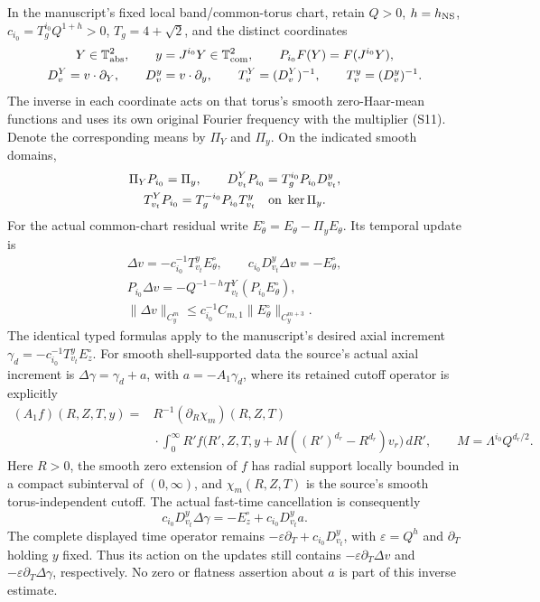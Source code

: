 \begin{proposition}
In the manuscript's fixed local band/common-torus chart, retain
$Q>0$, $h=h_{\rm NS}$, $c_{i_0}=T_g^{i_0}Q^{1+h}>0$,
$T_g=4+\sqrt2$, and the distinct coordinates
\[
 \begin{gathered}
 Y\in\mathbb T^2_{\rm abs},\qquad y=J^{i_0}Y\in\mathbb T^2_{\rm com},
 \qquad P_{i_0}F(Y)=F(J^{i_0}Y),\\
 D_v^Y=v\cdot\partial_Y,\qquad D_v^y=v\cdot\partial_y,\qquad
 T_v^Y=(D_v^Y)^{-1},\qquad T_v^y=(D_v^y)^{-1}.
 \end{gathered}
\]
The inverse in each coordinate acts on that torus's smooth
zero-Haar-mean functions and uses its own original Fourier
frequency with the multiplier (S11). Denote the corresponding
means by $\Pi_Y$ and $\Pi_y$. On the indicated smooth domains,
\[
 \begin{gathered}
 \Pi_Y P_{i_0}=\Pi_y,\qquad
 D_{v_t}^Y P_{i_0}=T_g^{i_0}P_{i_0}D_{v_t}^y,\\
 T_{v_t}^Y P_{i_0}=T_g^{-i_0}P_{i_0}T_{v_t}^y
       \quad\hbox{on }\ker\Pi_y.
 \end{gathered}
\]
For the actual common-chart residual write
$E_\theta^\circ=E_\theta-\Pi_yE_\theta$. Its temporal update is
\[
 \begin{gathered}
 \Delta v=-c_{i_0}^{-1}T_{v_t}^yE_\theta^\circ,\qquad
 c_{i_0}D_{v_t}^y\Delta v=-E_\theta^\circ,\\
 P_{i_0}\Delta v=-Q^{-1-h}T_{v_t}^Y(P_{i_0}E_\theta^\circ),\\
 \|\Delta v\|_{C_y^m}
       \leq c_{i_0}^{-1}C_{m,1}\|E_\theta^\circ\|_{C_y^{m+3}}.
 \end{gathered}
                                                               \tag{S17}
\]
The identical typed formulas apply to the manuscript's desired axial
increment $\gamma_d=-c_{i_0}^{-1}T_{v_t}^yE_z^\circ$.
For smooth shell-supported data the source's actual axial increment is
$\Delta\gamma=\gamma_d+a$, with $a=-A_1\gamma_d$, where its
retained cutoff operator is explicitly
\[
 \begin{split}
 (A_1f)(R,Z,T,y)
  ={}&R^{-1}(\partial_R\chi_m)(R,Z,T)\\
  &{}\cdot\int_0^\infty R'f\bigl(R',Z,T,
          y+M((R')^{d_r}-R^{d_r})v_r\bigr)\,dR',
 \qquad M=\Lambda^{i_0}Q^{d_r/2}.
 \end{split}
\]
Here $R>0$, the smooth zero extension of $f$ has radial support
locally bounded in a compact subinterval of $(0,\infty)$, and
$\chi_m(R,Z,T)$ is the source's smooth torus-independent cutoff.
The actual fast-time cancellation is consequently
\[
 c_{i_0}D_{v_t}^y\Delta\gamma
       =-E_z^\circ+c_{i_0}D_{v_t}^y a.
\]
The complete displayed time operator remains
$-\varepsilon\partial_T+c_{i_0}D_{v_t}^y$, with
$\varepsilon=Q^h$ and $\partial_T$ holding $y$ fixed. Thus its
action on the updates still contains
$-\varepsilon\partial_T\Delta v$ and
$-\varepsilon\partial_T\Delta\gamma$, respectively.
No zero or flatness assertion about $a$ is part of this inverse estimate.
\end{proposition}
